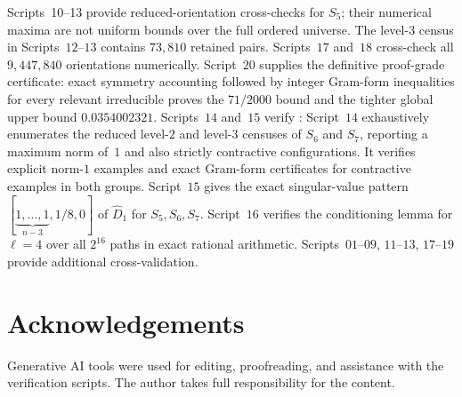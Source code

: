 \documentclass[version=final]{iacrcc}
\newcommand{\Dhat}{\widehat{D}}
\begin{document}
Scripts~10--13 provide reduced-orientation cross-checks for $S_5$; their
numerical maxima are not uniform bounds over the full ordered universe.
The level-$3$ census in Scripts~$12$--$13$ contains $73{,}810$ retained pairs.
Scripts~$17$ and~$18$ cross-check all $9{,}447{,}840$ orientations numerically.
Script~$20$ supplies the definitive proof-grade certificate: exact symmetry
accounting followed by integer Gram-form inequalities for every relevant
irreducible proves the $71/2000$ bound and the tighter global upper bound
$0.0354002321$. Scripts~$14$ and~$15$ verify
: Script~$14$ exhaustively enumerates the reduced
level-$2$ and level-$3$ censuses of $S_6$ and $S_7$, reporting
a maximum norm of~$1$ and also strictly contractive configurations. It verifies
explicit norm-$1$ examples and exact Gram-form certificates for contractive
examples in both groups. Script~$15$ gives the exact singular-value pattern
$[\underbrace{1,\ldots,1}_{n-3}, 1/8, 0]$ of $\Dhat_1$ for $S_5, S_6, S_7$.
Script~$16$ verifies the conditioning lemma for $\ell=4$ over all $2^{16}$ paths
in exact rational arithmetic. Scripts~$01$--$09$, $11$--$13$, $17$--$19$
provide additional cross-validation.


\section*{Acknowledgements}

Generative AI tools were used for editing, proofreading, and assistance with
the verification scripts. The author takes full responsibility for the content.



\end{document}
